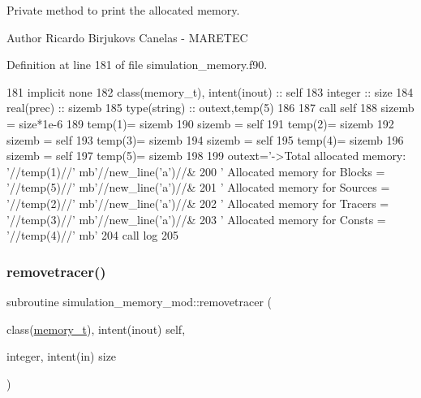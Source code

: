 Private method to print the allocated memory. 

\begin{DoxyAuthor}{Author}
Ricardo Birjukovs Canelas -\/ M\+A\+R\+E\+T\+EC 
\end{DoxyAuthor}


Definition at line 181 of file simulation\+\_\+memory.\+f90.


\begin{DoxyCode}
181     \textcolor{keywordtype}{implicit none}
182     \textcolor{keywordtype}{class}(memory\_t), \textcolor{keywordtype}{intent(inout)} :: self
183     \textcolor{keywordtype}{integer} :: size
184     \textcolor{keywordtype}{real(prec)} :: sizemb
185     \textcolor{keywordtype}{type}(string) :: outext,temp(5)
186 
187     \textcolor{keyword}{call }self%
188     sizemb = size*1e-6
189     temp(1)= sizemb
190     sizemb = self%
191     temp(2)= sizemb
192     sizemb = self%
193     temp(3)= sizemb
194     sizemb = self%
195     temp(4)= sizemb
196     sizemb = self%
197     temp(5)= sizemb
198 
199     outext=\textcolor{stringliteral}{'->Total allocated memory: '}//temp(1)//\textcolor{stringliteral}{' mb'}//new\_line(\textcolor{stringliteral}{'a'})//&
200         \textcolor{stringliteral}{'       Allocated memory for Blocks  = '}//temp(5)//\textcolor{stringliteral}{' mb'}//new\_line(\textcolor{stringliteral}{'a'})//&
201         \textcolor{stringliteral}{'       Allocated memory for Sources = '}//temp(2)//\textcolor{stringliteral}{' mb'}//new\_line(\textcolor{stringliteral}{'a'})//&
202         \textcolor{stringliteral}{'       Allocated memory for Tracers = '}//temp(3)//\textcolor{stringliteral}{' mb'}//new\_line(\textcolor{stringliteral}{'a'})//&
203         \textcolor{stringliteral}{'       Allocated memory for Consts  = '}//temp(4)//\textcolor{stringliteral}{' mb'}
204     \textcolor{keyword}{call }log%
205 
\end{DoxyCode}
\mbox{\label{namespacesimulation__memory__mod_a5f95539e9740401e7046b79c40ad2ecd}} 
\subsubsection{\texorpdfstring{removetracer()}{removetracer()}}
{\footnotesize\ttfamily subroutine simulation\+\_\+memory\+\_\+mod\+::removetracer (\begin{DoxyParamCaption}\item[{class(\mbox{\hyperlink{structsimulation__memory__mod_1_1memory__t}{memory\+\_\+t}}), intent(inout)}]{self,  }\item[{integer, intent(in)}]{size }\end{DoxyParamCaption})\hspace{0.3cm}{\ttfamily [private]}}



